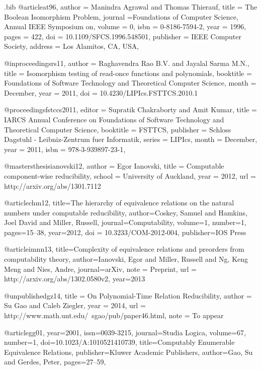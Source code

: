 \begin{filecontents*}{\jobname.bib}
@article{at96,
author = {Manindra Agrawal and Thomas Thierauf},
title = {{The Boolean Isomorphism Problem}},
journal ={{Foundations of Computer Science, Annual IEEE Symposium on}},
volume = {0},
isbn = {0-8186-7594-2},
year = {1996},
pages = {422},
doi = {10.1109/SFCS.1996.548501},
publisher = {IEEE Computer Society},
address = {Los Alamitos, CA, USA},
}

@inproceedings{rs11,
  author    = {Raghavendra Rao B.V. and Jayalal Sarma M.N.},
  title     = {Isomorphism testing of read-once functions and polynomials},
  booktitle = {Foundations of Software Technology and Theoretical Computer Science},
  month = {December},
  year      = {2011},
  doi = {10.4230/LIPIcs.FSTTCS.2010.1}
}

@proceedings{fstccs2011,
  editor    = {Supratik Chakraborty and Amit Kumar},
  title     = {IARCS Annual Conference on Foundations of Software Technology
               and Theoretical Computer Science},
  booktitle = {FSTTCS},
  publisher = {Schloss Dagstuhl - Leibniz-Zentrum fuer Informatik},
  series    = {LIPIcs},
  month = {December},
  year      = {2011},
  isbn      = {978-3-939897-23-1},
}

@mastersthesis{ianovski12,
  author = {Egor Ianovski},
  title = {Computable component-wise reducibility},
  school = {University of Auckland},
  year = 2012,
  url = {http://arxiv.org/abs/1301.7112}
}

@article{chm12,
  title={The hierarchy of equivalence relations on the natural numbers under computable reducibility},
  author={Coskey, Samuel and Hamkins, Joel David and Miller, Russell},
  journal={Computability},
  volume=1,
  number=1,
  pages={15--38},
  year=2012,
  doi = {10.3233/COM-2012-004},
  publisher={IOS Press}
}

@article{imnn13,
  title={Complexity of equivalence relations and preorders from computability theory},
  author={Ianovski, Egor and Miller, Russell and Ng, Keng Meng and Nies, Andre},
  journal={arXiv},
  note = {Preprint},
  url = {http://arxiv.org/abs/1302.0580v2},
  year={2013}
}

@unpublished{gz14,
  title = {On Polynomial-Time Relation Reducibility},
  author = {Su Gao and Caleb Ziegler},
  year = 2014,
  url = {http://www.math.unt.edu/~sgao/pub/paper46.html},
  note = {To appear}
}

@article{gg01,
year=2001,
issn={0039-3215},
journal={Studia Logica},
volume=67,
number=1,
doi={10.1023/A:1010521410739},
title={Computably Enumerable Equivalence Relations},
publisher={Kluwer Academic Publishers},
author={Gao, Su and Gerdes, Peter},
pages={27--59},
}


\end{filecontents*}
